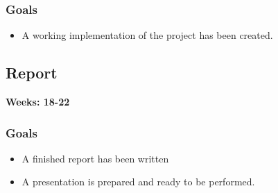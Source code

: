 \documentclass[11pt]{article}
\begin{document}
\subsubsection{Goals}
\label{sec:orge58115e}
\begin{itemize}
\item A working implementation of the project has been created.
\end{itemize}

\subsection{Report}
\label{sec:org50fc1f2}
\textbf{Weeks: 18-22}

\subsubsection{Goals}
\label{sec:org8156ff7}
\begin{itemize}
\item A finished report has been written
\item A presentation is prepared and ready to be performed.
\end{itemize}
\end{document}

